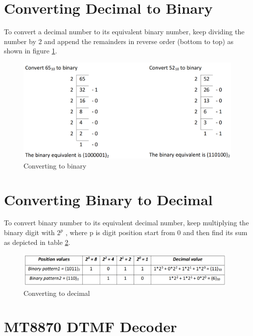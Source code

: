 \section{Converting Decimal to Binary}

To convert a decimal number to its equivalent binary number, keep dividing the number by 2 and append the remainders in reverse order (bottom to top) as shown in figure \ref{fig:dec_to_bin}.

\begin{figure}
    \centering
    \includegraphics{Images/DTMF/decimal_to_binary.png}
    \caption[Decimal to binary]{Converting to binary}
    \label{fig:dec_to_bin}
\end{figure}

\section{Converting Binary to Decimal}

To convert binary number to its equivalent decimal number, keep multiplying the binary digit with $2^p$ , where p is digit position start from 0 and then find its sum as depicted in table \ref{fig:bin_to_dec}.

\begin{figure}
    \centering
    \includegraphics[width=4.3in]{Tables/DTMF/binary_decimal.png}
    \caption[Binary to decimal]{Converting to decimal}
    \label{fig:bin_to_dec}
\end{figure}

\section{MT8870 DTMF Decoder}

